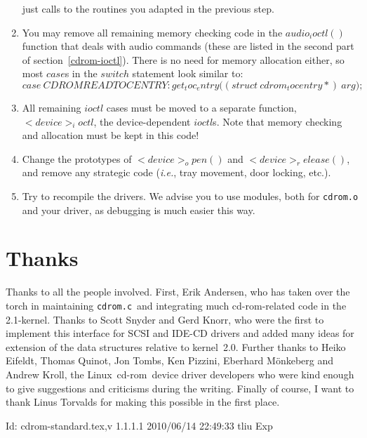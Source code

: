 \documentclass{article}
\def\version{$Id: cdrom-standard.tex,v 1.1.1.1 2010/06/14 22:49:33 tliu Exp $}
\newcommand{\newsection}[1]{\newpage\section{#1}}
\def\linux{{\sc Linux}}
\def\cdrom{{\sc cd-rom}}
\def\cdromc{{\tt {cdrom.c}}}
\def\fo{\sl}                    %
\def\ie{{\fo i.e.}}
\begin{document}
\begin{enumerate}
  just calls to the routines you adapted in the previous step.
\item You may remove all remaining memory checking code in the
  $audio_ioctl()$ function that deals with audio commands (these are
  listed in the second part of section~\ref{cdrom-ioctl}). There is no
  need for memory allocation either, so most $case$s in the $switch$
  statement look similar to:
  $$
  case\ CDROMREADTOCENTRY\colon get_toc_entry\bigl((struct\ 
  cdrom_tocentry *{})\ arg\bigr);
  $$
\item All remaining $ioctl$ cases must be moved to a separate
  function, $<device>_ioctl$, the device-dependent $ioctl$s. Note that
  memory checking and allocation must be kept in this code!
\item Change the prototypes of $<device>_open()$ and
  $<device>_release()$, and remove any strategic code (\ie, tray
  movement, door locking, etc.).
\item Try to recompile the drivers. We advise you to use modules, both
  for {\tt {cdrom.o}} and your driver, as debugging is much easier this
  way.
\end{enumerate} 

\newsection{Thanks}

Thanks to all the people involved.  First, Erik Andersen, who has
taken over the torch in maintaining \cdromc\ and integrating much
\cdrom-related code in the 2.1-kernel.  Thanks to Scott Snyder and
Gerd Knorr, who were the first to implement this interface for SCSI
and IDE-CD drivers and added many ideas for extension of the data
structures relative to kernel~2.0.  Further thanks to Heiko Ei{\sz}feldt,
Thomas Quinot, Jon Tombs, Ken Pizzini, Eberhard M\"onkeberg and Andrew
Kroll, the \linux\ \cdrom\ device driver developers who were kind
enough to give suggestions and criticisms during the writing. Finally
of course, I want to thank Linus Torvalds for making this possible in
the first place.

\vfill
$ \version\ $
\eject
\end{document}

